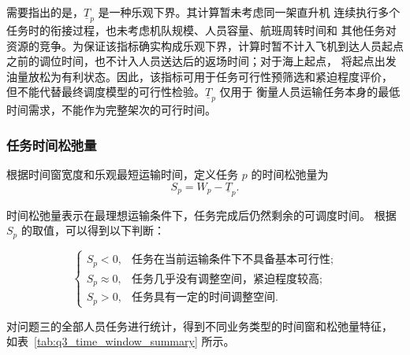 \documentclass[UTF8,a4paper,zihao=5]{ctexart}
\begin{document}
需要指出的是，$\underline{T}_p$ 是一种乐观下界。其计算暂未考虑同一架直升机
连续执行多个任务时的衔接过程，也未考虑机队规模、人员容量、航班周转时间和
其他任务对资源的竞争。为保证该指标确实构成乐观下界，计算时暂不计入飞机到达人员起点
之前的调位时间，也不计入人员送达后的返场时间；对于海上起点，
将起点出发油量放松为有利状态。因此，该指标可用于任务可行性预筛选和紧迫程度评价，
但不能代替最终调度模型的可行性检验。$\underline{T}_p$ 仅用于
衡量人员运输任务本身的最低时间需求，不能作为完整架次的可行时间。
\subsubsection{任务时间松弛量}

根据时间窗宽度和乐观最短运输时间，定义任务 $p$ 的时间松弛量为
\begin{equation}
    S_p=W_p-\underline{T}_p.
    \label{eq:q3_slack}
\end{equation}

时间松弛量表示在最理想运输条件下，任务完成后仍然剩余的可调度时间。
根据 $S_p$ 的取值，可以得到以下判断：

\begin{equation}
    \begin{cases}
        S_p<0, & \text{任务在当前运输条件下不具备基本可行性};\\
        S_p\approx 0, & \text{任务几乎没有调整空间，紧迫程度较高};\\
        S_p>0, & \text{任务具有一定的时间调整空间}.
    \end{cases}
\end{equation}

对问题三的全部人员任务进行统计，得到不同业务类型的时间窗和松弛量特征，
如表~\ref{tab:q3_time_window_summary} 所示。

\begin{table}[htbp]
    \centering
    \small
    \caption{问题三不同业务类型的时间窗与松弛量统计}
    \label{tab:q3_time_window_summary}
\end{table}
\end{document}

